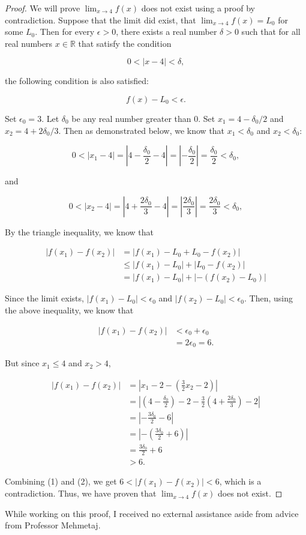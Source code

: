 \documentclass[12pt]{article}
\begin{document}
\begin{proof}
    We will prove $\lim_{x\to 4} f(x) $ does not exist using a proof by contradiction. Suppose that the limit did exist, that $\lim_{x\to 4} f(x) = L_0$ for some $L_0$. Then for every $\epsilon > 0$, there exists a real number $\delta > 0$ such that for all real numbers $x \in \mathbb{R}$ that satisfy the condition

    \[0 < |x - 4| < \delta,\]

    the following condition is also satisfied:

    \[ f(x) - L_0 < \epsilon.\]

    \noindent Set $\epsilon_0 = 3$. Let $\delta_0$ be any real number greater than 0. Set $x_1 = 4 - \delta_0/2$ and $x_2 = 4 + 2\delta_0/3$. Then as demonstrated below, we know that $x_1 < \delta_0$ and $x_2 < \delta_0$:
    
    \[ 0 < |x_1 - 4| = \left| 4 - \frac{\delta_0}{2} - 4 \right| = \left|- \frac{\delta_0}{2} \right| = \frac{\delta_0}{2} < \delta_0, \]

    and

    \[ 0 < |x_2 - 4| = \left| 4 + \frac{2\delta_0}{3} - 4 \right| = \left| \frac{2\delta_0}{3} \right| = \frac{2\delta_0}{3} < \delta_0, \]

    \noindent By the triangle inequality, we know that

    \begin{align*}
        |f(x_1) - f(x_2)| & = |f(x_1) - L_0 + L_0 - f(x_2)| \tag{1}\\
        & \leq |f(x_1) - L_0| + |L_0 - f(x_2)| \\
        & = |f(x_1) - L_0| + |-(f(x_2) - L_0) |
    \end{align*}

    Since the limit exists, $|f(x_1) - L_0| < \epsilon_0$ and $|f(x_2) - L_0| < \epsilon_0$. Then, using the above inequality, we know that

    \begin{align*}
        |f(x_1) - f(x_2)| & < \epsilon_0 + \epsilon_0 \\
        & = 2\epsilon_0 = 6.
    \end{align*} %

    But since $x_1 \leq 4$ and $x_2 > 4$,

    \begin{align*}
        |f(x_1) - f(x_2)| & = \left|x_1 - 2 - \left(\frac{3}{2}x_2 - 2\right)\right| \tag{2}\\
        & = \left| \left(4 - \frac{\delta_0}{2}\right) - 2 - \frac{3}{2}\left(4 + \frac{2\delta_0}{3}\right) - 2 \right| \\
        & = \left| -\frac{3\delta_0}{2} - 6 \right| \\
        & = \left| -\left(\frac{3\delta_0}{2} + 6\right) \right| \\
        & = \frac{3\delta_0}{2} + 6 \\
        & > 6.
    \end{align*}

    Combining (1) and (2), we get $6 < |f(x_1) - f(x_2)| < 6$, which is a contradiction. Thus, we have proven that $\lim_{x\to 4} f(x) $ does not exist.

    

\end{proof}

\noindent While working on this proof, I received no external assistance aside from advice from Professor Mehmetaj.
\end{document}
